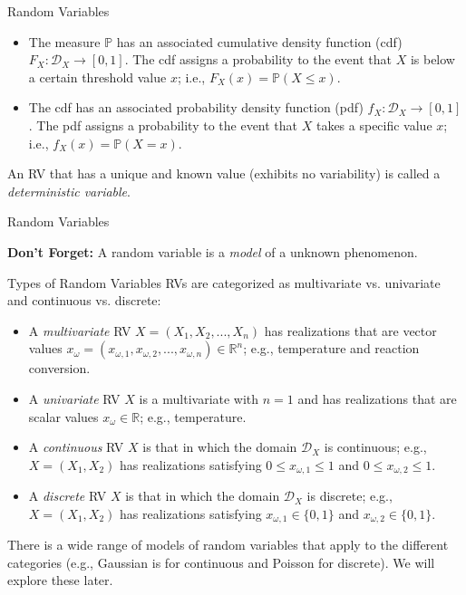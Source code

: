 \documentclass[9pt]{beamer}
\begin{document}
\begin{frame}{Random Variables}
\begin{block}{}
\begin{itemize}
\item The measure $\mathbb{P}$ has an associated cumulative density function (cdf) $F_X:\mathcal{D}_X\to [0,1]$. The cdf assigns a probability to the event that $X$ is below a certain threshold value $x$; i.e., $F_X(x)=\mathbb{P}(X\leq x)$.
\item The cdf has an associated probability density function (pdf) $f_X:\mathcal{D}_X\to [0,1]$. The pdf assigns a probability to the event that $X$ takes a specific value $x$; i.e., $f_X(x)=\mathbb{P}(X=x)$.  
\end{itemize}
\end{block}
An RV that has a unique and known value (exhibits no variability) is called a {\em deterministic variable}. 
\end{frame}


\begin{frame}{Random Variables}
\begin{block}{}
{\bf Don't Forget:} A random variable is a {\em model} of a unknown phenomenon. 
\end{block}
\end{frame}

\begin{frame}{Types of Random Variables}
RVs are categorized as multivariate vs. univariate and continuous vs. discrete:

\begin{block}{}
\begin{itemize}
\item A {\em multivariate} RV $X=(X_{1},X_{2},...,X_n)$ has realizations that are vector values $x_{\omega}=(x_{\omega,1},x_{\omega,2},...,x_{\omega,n})\in \mathbb{R}^n$; e.g., temperature and reaction conversion.
\item A {\em univariate} RV $X$ is a multivariate with $n=1$ and has realizations that are scalar values $x_\omega\in \mathbb{R}$; e.g., temperature.
\item A {\em continuous} RV $X$ is that in which the domain $\mathcal{D}_X$ is continuous; e.g., $X=(X_1,X_2)$ has realizations satisfying $0\leq x_{\omega,1}\leq 1$ and $0\leq x_{\omega,2}\leq 1$.
\item A {\em discrete} RV $X$ is that in which the domain $\mathcal{D}_X$ is discrete; e.g., $X=(X_1,X_2)$ has realizations satisfying $x_{\omega,1}\in \{0,1\}$ and $x_{\omega,2}\in \{0,1\}$.
\end{itemize}
\end{block}
There is a wide range of models of random variables that apply to the different categories (e.g., Gaussian is for continuous and Poisson for discrete). We will explore these later.  
\end{frame}
\end{document}
